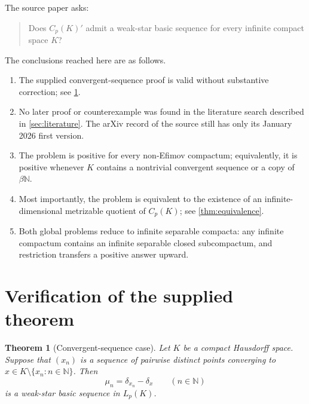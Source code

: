 \documentclass[11pt]{article}
\newtheorem{theorem}{Theorem}[section]
\newcommand{\Cp}{C_p}
\newcommand{\Lp}{L_p}
\newcommand{\N}{\mathbb{N}}
\begin{document}
The source paper asks:
\begin{quote}
Does $\Cp(K)'$ admit a weak-star basic sequence for every infinite compact
space $K$?
\end{quote}

The conclusions reached here are as follows.

\begin{enumerate}[label=\textup{(\roman*)}]
\item The supplied convergent-sequence proof is valid without substantive
      correction; see \cref{sec:verification}.
\item No later proof or counterexample was found in the literature search
      described in \cref{sec:literature}.  The arXiv record of the source still
      has only its January 2026 first version.
\item The problem is positive for every non-Efimov compactum; equivalently, it
      is positive whenever $K$ contains a nontrivial convergent sequence or a
      copy of $\beta\N$.
\item Most importantly, the problem is equivalent to the existence of an
      infinite-dimensional metrizable quotient of $\Cp(K)$; see
      \cref{thm:equivalence}.
\item Both global problems reduce to infinite separable compacta: any infinite
      compactum contains an infinite separable closed subcompactum, and
      restriction transfers a positive answer upward.
\end{enumerate}

\section{Verification of the supplied theorem}\label{sec:verification}

\begin{theorem}[Convergent-sequence case]\label{thm:sequence}
Let $K$ be a compact Hausdorff space.  Suppose that $(x_n)$ is a sequence of
pairwise distinct points converging to
$x\in K\setminus\{x_n:n\in\N\}$.  Then
\[
 \mu_n=\delta_{x_n}-\delta_x\qquad(n\in\N)
\]
is a weak-star basic sequence in $\Lp(K)$.
\end{theorem}
\end{document}
